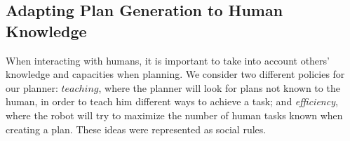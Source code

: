 



\subsection{Adapting Plan Generation to Human Knowledge}
\label{subsec:plan_generation-adapting_knowledge}
When interacting with humans, it is important to take into account others' knowledge and capacities when planning. We consider two different policies for our planner: $teaching$, where the planner will look for plans not known to the human, in order to teach him different ways to achieve a task; and \textit{efficiency}, where the robot will try to maximize the number of human tasks known when creating a plan. These ideas were represented as social rules.

